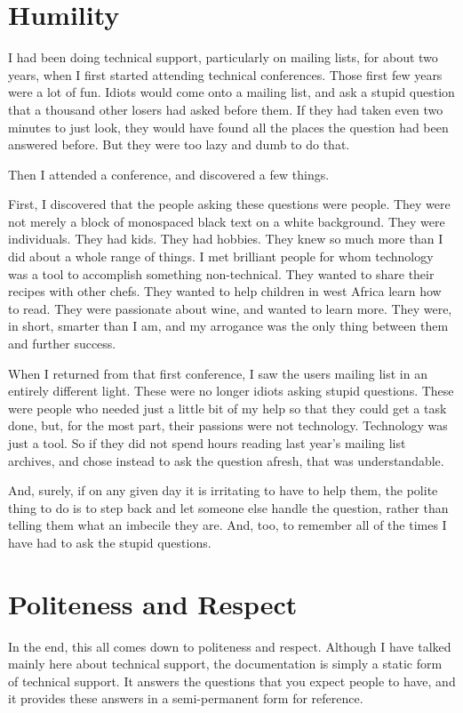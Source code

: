 \section*{Humility}
I had been doing technical support, particularly on mailing lists, for about two
years, when I first started attending technical conferences. Those first few
years were a lot of fun. Idiots would come onto a mailing list, and ask a stupid
question that a thousand other losers had asked before them. If they had taken
even two minutes to just look, they would have found all the places the question
had been answered before. But they were too lazy and dumb to do that.

Then I attended a conference, and discovered a few things.

First, I discovered that the people asking these questions were people. They
were not merely a block of monospaced black text on a white background. They
were individuals. They had kids. They had hobbies. They knew so much more than I
did about a whole range of things. I met brilliant people for whom
technology was a tool to accomplish something non-technical. They wanted to
share their recipes with other chefs. They wanted to help children in west
Africa learn how to read. They were passionate about wine, and wanted to learn
more. They were, in short, smarter than I am, and my arrogance was the only
thing between them and further success.

When I returned from that first conference, I saw the users mailing list in an
entirely different light. These were no longer idiots asking stupid questions.
These were people who needed just a little bit of my help so that they could get
a task done, but, for the most part, their passions were not technology.
Technology was just a tool. So if they did not spend hours reading last year’s
mailing list archives, and chose instead to ask the question afresh, that was
understandable.

And, surely, if on any given day it is irritating to have to help them, the
polite thing to do is to step back and let someone else handle the question,
rather than telling them what an imbecile they are. And, too, to remember all of
the times I have had to ask the stupid questions.

\section*{Politeness and Respect}
In the end, this all comes down to politeness and respect. Although I have
talked mainly here about technical support, the documentation is simply a static
form of technical support. It answers the questions that you expect people to
have, and it provides these answers in a semi-permanent form for reference.

